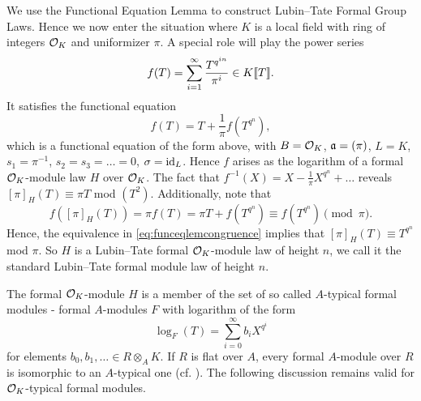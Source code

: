 We use the Functional Equation Lemma to construct Lubin--Tate Formal Group Laws. 
Hence we now enter the situation where $K$ is a local field with ring of integers
$\mathcal{O}_K$ and uniformizer $\pi$. A special role will play the power series
\begin{equation*}
  f(T) = \sum_{i=1}^\infty \frac{T^{q^{in}}}{\pi^i} \in K\llbracket T \rrbracket.
\end{equation*}
It satisfies the functional equation
\begin{equation*}
  f(T) = T + \frac 1\pi f(T^{q^n}),
\end{equation*}
which is a functional equation of the form above, with 
$B = \mathcal{O}_K$, $\mathfrak{a} = (\pi)$, $L = K$, $s_1 = \pi^{-1}$, $s_2 = s_3 = \dots = 0$,
$\sigma = \operatorname{id}_L$. 
Hence $f$ arises as the logarithm of a formal $\mathcal{O}_K$-module law $H$ over $\mathcal{O}_K$.
The fact that $f^{-1}(X) = X - \frac 1\pi X^{q^n} + \dots$ reveals
$[\pi]_H(T) \equiv \pi T$ mod $(T^2)$. Additionally, note that 
\begin{equation*}
  f([\pi]_H(T)) = \pi f(T) = \pi T + f(T^{q^n}) \equiv f(T^{q^n}) \pmod \pi.
\end{equation*}
Hence, the equivalence in \eqref{eq:funceqlemcongruence} implies that 
$[\pi]_H(T) \equiv T^{q^n}$ mod $\pi$. So $H$ is a Lubin--Tate formal $\mathcal{O}_K$-module
law of height $n$, we call it the standard Lubin--Tate formal module law of
height $n$. 
\begin{rmk} 
  The formal $\mathcal{O}_K$-module $H$ is a member of the set of so called $A$-typical
  formal modules - formal $A$-modules $F$ with logarithm of the 
  form
  \begin{equation*}
    \log_F(T) = \sum_{i=0}^\infty b_i X^{q^i}
  \end{equation*}
  for elements $b_0, b_1, \dots \in R \otimes_A K$. If $R$ is flat over $A$,
  every formal $A$-module over $R$ is isomorphic to an $A$-typical one
  (cf. \cite[21.5.6]{hazewinkel1978formal}). The following discussion remains
  valid for $\mathcal{O}_K$-typical formal modules.
\end{rmk}

